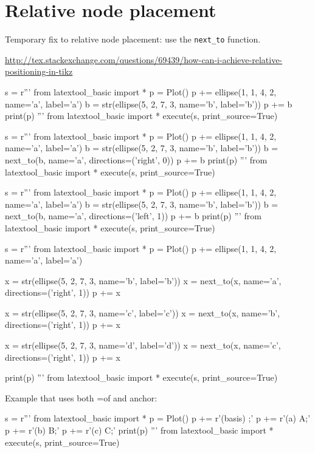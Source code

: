 \section{Relative node placement}

Temporary fix to relative node placement: use the \verb!next_to! function.


\url{http://tex.stackexchange.com/questions/69439/how-can-i-achieve-relative-positioning-in-tikz}

\begin{python}
s = r'''
from latextool_basic import *
p = Plot()
p += ellipse(1, 1, 4, 2, name='a', label='a')
b = str(ellipse(5, 2, 7, 3, name='b', label='b'))
p += b
print(p)
'''
from latextool_basic import *
execute(s, print_source=True)
\end{python}

\begin{python}
s = r'''
from latextool_basic import *
p = Plot()
p += ellipse(1, 1, 4, 2, name='a', label='a')
b = str(ellipse(5, 2, 7, 3, name='b', label='b'))
b = next_to(b, name='a', directions=('right', 0))
p += b
print(p)
'''
from latextool_basic import *
execute(s, print_source=True)
\end{python}

\begin{python}
s = r'''
from latextool_basic import *
p = Plot()
p += ellipse(1, 1, 4, 2, name='a', label='a')
b = str(ellipse(5, 2, 7, 3, name='b', label='b'))
b = next_to(b, name='a', directions=('left', 1))
p += b
print(p)
'''
from latextool_basic import *
execute(s, print_source=True)
\end{python}

\begin{python}
s = r'''
from latextool_basic import *
p = Plot()
p += ellipse(1, 1, 4, 2, name='a', label='a')

x = str(ellipse(5, 2, 7, 3, name='b', label='b'))
x = next_to(x, name='a', directions=('right', 1))
p += x

x = str(ellipse(5, 2, 7, 3, name='c', label='c'))
x = next_to(x, name='b', directions=('right', 1))
p += x

x = str(ellipse(5, 2, 7, 3, name='d', label='d'))
x = next_to(x, name='c', directions=('right', 1))
p += x

print(p)
'''
from latextool_basic import *
execute(s, print_source=True)
\end{python}



\newpage
Example that uses both =of and anchor:
\begin{python}
s = r'''
from latextool_basic import *
p = Plot()
p += r'\node[minimum width=5cm, draw, rectangle] (basis) {};'
p += r'\node[above=of basis.north west, anchor=south west, draw, rectangle, minimum width=1cm] (a) {A};'
p += r'\node[above=of basis, draw, rectangle,minimum width=1cm] (b) {B};'
p += r'\node[above=of basis.north east, anchor=south east, draw, rectangle, minimum width=1cm] (c) {C};'
print(p)
'''
from latextool_basic import *
execute(s, print_source=True)
\end{python}

